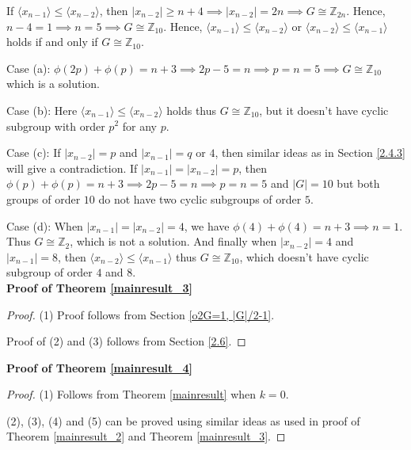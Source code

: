 \documentclass[a4paper,11pt]{amsart}
\numberwithin{equation}{section}
\numberwithin{equation}{subsection}
\begin{document}
If $\langle x_{n-1}\rangle \leq \langle x _{n-2} \rangle$, then $|x_{n-2}| \geq n+4\implies |x_{n-2}| = 2n \implies G\cong \mathbb Z_{2n}$. Hence, $n-4 = 1\implies n=5\implies G\cong \mathbb{Z}_{10}$. 
 Hence,  $\langle x_{n-1}\rangle \leq \langle x _{n-2} \rangle$ or  $\langle x_{n-2}\rangle \leq \langle x _{n-1} \rangle$ holds if and only if $G \cong \mathbb{Z}_{10}$.
 
Case (a): $\phi(2p)+\phi(p)=n+3\implies 2p-5=n\implies p=n=5\implies G\cong \mathbb{Z}_{10}$ which is a solution.

Case (b):  Here  $\langle x_{n-1}\rangle \leq \langle x _{n-2} \rangle$ holds thus $G\cong \mathbb{Z}_{10}$, but it doesn't have cyclic subgroup with order $p^{2}$ for any $p$.

Case (c):
If $|x_{n-2}|=p$ and  $|x_{n-1}|=q$ or $4$, then similar ideas as in Section \ref{2.4.3} will give a contradiction. If $|x_{n-1}|=|x_{n-2}|=p$, then $\phi(p) + \phi(p)=n+3\implies 2p-5=n\implies p=n=5$ and $|G|=10$ but both groups of order $10$ do not have two cyclic subgroups of order $5$. 

Case (d): When $|x_{n-1}|=|x_{n-2}|=4$, we have $\phi{(4)}+\phi{(4)}=n+3\implies n=1$. Thus $G\cong \mathbb{Z}_2$, which is not a solution. And finally when $|x_{n-2}|=4$ and $|x_{n-1}|=8$, then $\langle x_{n-2}\rangle \leq \langle x_{n-1}\rangle$ thus $G\cong \mathbb{Z}_{10}$, which doesn't have cyclic subgroup of order $4$ and $8$. 
\\


\noindent\textbf{Proof of Theorem \ref{mainresult_3}}
\begin{proof}
 (1) Proof follows from Section \ref{o2G=1, |G|/2-1}. 
 
 Proof of (2) and (3) follows from  Section \ref{2.6}.
\end{proof}



\noindent\textbf{Proof of Theorem \ref{mainresult_4}}
\begin{proof}
 (1) Follows from Theorem  \ref{mainresult} when $k=0$.

(2), (3), (4) and (5) can be proved using similar ideas as used in proof of Theorem \ref{mainresult_2} and Theorem \ref{mainresult_3}.
\end{proof}
\end{document}
